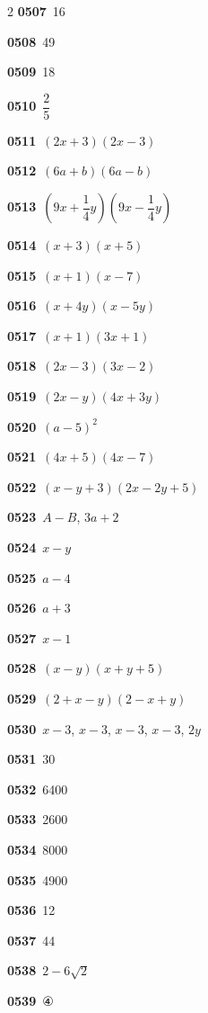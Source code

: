 \documentclass[10pt,a4paper]{article}
\begin{document}
\begin{multicols}{2}
\noindent\textbf{0507}\ 16\par
\noindent\textbf{0508}\ 49\par
\noindent\textbf{0509}\ 18\par
\noindent\textbf{0510}\ $\dfrac{2}{5}$\par
\noindent\textbf{0511}\ $(2x+3)(2x-3)$\par
\noindent\textbf{0512}\ $(6a+b)(6a-b)$\par
\noindent\textbf{0513}\ $\left(9x+\dfrac{1}{4}y\right)\left(9x-\dfrac{1}{4}y\right)$\par
\noindent\textbf{0514}\ $(x+3)(x+5)$\par
\noindent\textbf{0515}\ $(x+1)(x-7)$\par
\noindent\textbf{0516}\ $(x+4y)(x-5y)$\par
\noindent\textbf{0517}\ $(x+1)(3x+1)$\par
\noindent\textbf{0518}\ $(2x-3)(3x-2)$\par
\noindent\textbf{0519}\ $(2x-y)(4x+3y)$\par
\noindent\textbf{0520}\ $(a-5)^2$\par
\noindent\textbf{0521}\ $(4x+5)(4x-7)$\par
\noindent\textbf{0522}\ $(x-y+3)(2x-2y+5)$\par
\noindent\textbf{0523}\ $A-B$, $3a+2$\par
\noindent\textbf{0524}\ $x-y$\par
\noindent\textbf{0525}\ $a-4$\par
\noindent\textbf{0526}\ $a+3$\par
\noindent\textbf{0527}\ $x-1$\par
\noindent\textbf{0528}\ $(x-y)(x+y+5)$\par
\noindent\textbf{0529}\ $(2+x-y)(2-x+y)$\par
\noindent\textbf{0530}\ $x-3$, $x-3$, $x-3$, $x-3$, $2y$\par
\noindent\textbf{0531}\ 30\par
\noindent\textbf{0532}\ 6400\par
\noindent\textbf{0533}\ 2600\par
\noindent\textbf{0534}\ 8000\par
\noindent\textbf{0535}\ 4900\par
\noindent\textbf{0536}\ 12\par
\noindent\textbf{0537}\ 44\par
\noindent\textbf{0538}\ $2-6\sqrt{2}$\par
\noindent\textbf{0539}\ ④\par

\end{multicols}
\end{document}
